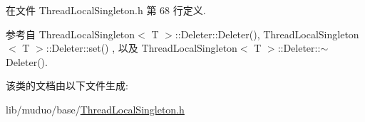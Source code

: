 在文件 Thread\+Local\+Singleton.\+h 第 68 行定义.



参考自 Thread\+Local\+Singleton$<$ T $>$\+::\+Deleter\+::\+Deleter(), Thread\+Local\+Singleton$<$ T $>$\+::\+Deleter\+::set() , 以及 Thread\+Local\+Singleton$<$ T $>$\+::\+Deleter\+::$\sim$\+Deleter().



该类的文档由以下文件生成\+:\begin{DoxyCompactItemize}
\item 
lib/muduo/base/\hyperlink{ThreadLocalSingleton_8h}{Thread\+Local\+Singleton.\+h}\end{DoxyCompactItemize}
